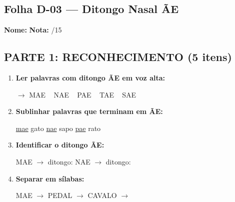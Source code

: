 
\subsection{Folha D-03 --- Ditongo Nasal \~AE}

\begin{exercicio}

\noindent\textbf{Nome:} \underline{\hspace{4cm}} \quad \textbf{Nota:} \underline{\hspace{1cm}}/15

\subsection*{PARTE 1: RECONHECIMENTO (5 itens)}

\begin{enumerate}
  \item \textbf{Ler palavras com ditongo \~AE em voz alta:}
  \begin{center}
  $\rightarrow$ MAE  ~  NAE  ~  PAE  ~  TAE  ~  SAE
  \end{center}

  \item \textbf{Sublinhar palavras que terminam em \~AE:}
  \begin{center}
  \uline{mae} \quad gato \quad \uline{nae} \quad sapo \quad \uline{pae} \quad rato
  \end{center}

  \item \textbf{Identificar o ditongo \~AE:}
  \begin{center}
  MAE $\rightarrow$ ditongo: \underline{\hspace{1cm}} \quad NAE $\rightarrow$ ditongo: \underline{\hspace{1cm}}
  \end{center}

  \item \textbf{Separar em sílabas:}
  \begin{center}
  MAE $\rightarrow$ \underline{\hspace{1.5cm}} \quad PEDAL $\rightarrow$ \underline{\hspace{1.5cm}} \underline{\hspace{1.5cm}} \quad CAVALO $\rightarrow$ \underline{\hspace{1.5cm}} \underline{\hspace{1.5cm}} \underline{\hspace{1.5cm}}
  \end{center}


\end{enumerate}
\end{exercicio}
